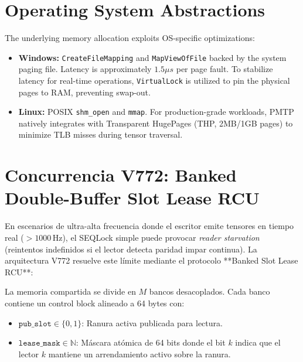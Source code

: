 \section{Operating System Abstractions}

The underlying memory allocation exploits OS-specific optimizations:
\begin{itemize}
    \item \textbf{Windows:} \texttt{CreateFileMapping} and \texttt{MapViewOfFile} backed by the system paging file. Latency is approximately $1.5\mu s$ per page fault. To stabilize latency for real-time operations, \texttt{VirtualLock} is utilized to pin the physical pages to RAM, preventing swap-out.
    \item \textbf{Linux:} POSIX \texttt{shm\_open} and \texttt{mmap}. For production-grade workloads, PMTP natively integrates with Transparent HugePages (THP, 2MB/1GB pages) to minimize TLB misses during tensor traversal.
\end{itemize}

\section{Concurrencia V772: Banked Double-Buffer Slot Lease RCU}


En escenarios de ultra-alta frecuencia donde el escritor emite tensores en tiempo real ($> 1000\,\text{Hz}$), el SEQLock simple puede provocar \emph{reader starvation} (reintentos indefinidos si el lector detecta paridad impar continua). La arquitectura V772 resuelve este límite mediante el protocolo **Banked Slot Lease RCU**:

\begin{definition}
La memoria compartida se divide en $M$ bancos desacoplados. Cada banco contiene un control block alineado a 64 bytes con:
\begin{itemize}
    \item $\texttt{pub\_slot} \in \{0, 1\}$: Ranura activa publicada para lectura.
    \item $\texttt{lease\_mask} \in \mathbb{N}$: Máscara atómica de 64 bits donde el bit $k$ indica que el lector $k$ mantiene un arrendamiento activo sobre la ranura.
\end{itemize}
\end{definition}

